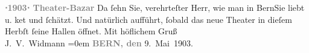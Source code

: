 \begin{ledgroupsized}[t]{13cm}
           \noindent{}\centering{}\textcolor{gray}{\textbf{{\pb}⋅1903⋅
                     Theater-Bazar}}\pend
           \pstart
           Da ſehn Sie, verehrteſter Herr, wie man in BernSie liebt u. ke{\geminationn}t und
               ſchätzt. Und natürlich aufführt, ſobald das neue Theater in dieſem Herbſt ſeine Hallen
               öffnet.\pend
           \pstart
           Mit höflichem Gruß{\\[\baselineskip]}\spacefill\mbox{J. V. Widmann}\pend
           \leftskip=0em{}\pstart
           \textcolor{gray}{\textbf{BERN, den}}{ }9. Mai 1903.\pend
           
         
         \endnumbering{}\end{ledgroupsized}  \newcommand{\dateiname}{L01288}\newcommand{\titel}{Joseph Victor Widmann an Arthur Schnitzler, 9. 5. 1903}\newcommand{\editorInnen}{Martin Anton Müller und Gerd-Hermann Susen}
      